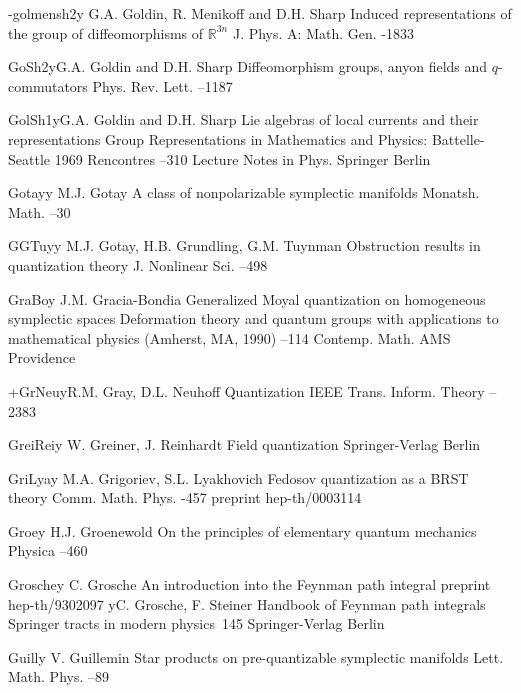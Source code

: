 \documentclass[12pt]{amsart}
\numberwithin{equation}{section}
\theoremstyle{remark}
\newcommand{\by}{\mathbf y}
\begin{document}
\begin{thebibliography}{199}
 -golmensh2\by{ G.A. Goldin, R. Menikoff and D.H. Sharp \paper Induced
representations of the group of diffeomorphisms of ${\mathbb R}^{3n}$ \jour J.
Phys. A: Math. Gen.   -1833}


 GoSh2\by{G.A. Goldin and D.H. Sharp \paper Diffeomorphism groups, anyon fields and
$q$-commutators \jour Phys. Rev. Lett.   --1187}

 GolSh1\by{G.A. Goldin and D.H. Sharp \paper Lie algebras of local currents
and their representations \inbook Group Representations in Mathematics and Physics:
Battelle-Seattle 1969 Rencontres --310 \bookinfo Lecture Notes in Phys. 
\publ Springer \publaddr Berlin }


 Gotay\by{ M.J. Gotay \paper A class of nonpolarizable symplectic
manifolds \jour Monatsh. Math.   --30}

 GGTuy\by{ M.J. Gotay, H.B. Grundling, G.M. Tuynman \paper Obstruction
results in quantization theory \jour J. Nonlinear Sci.   --498}

 GraBo\by{ J.M. Gracia-Bondia \paper Generalized Moyal quantization on
homogeneous symplectic spaces \inbook Deformation theory and quantum groups
with applications to mathematical physics (Amherst, MA, 1990) --114
\bookinfo Contemp. Math.  \publ AMS \publaddr Providence }

 +GrNeu\by{R.M. Gray, D.L. Neuhoff \paper Quantization \jour IEEE Trans.
Inform. Theory   --2383}

 GreiRei\by{ W. Greiner, J. Reinhardt \book Field quantization \publ
Springer-Verlag \publaddr Berlin }

 GriLya\by{ M.A. Grigoriev, S.L. Lyakhovich \paper Fedosov quantization as
a BRST theory \jour Comm. Math. Phys.   -457
\paperinfo preprint hep-th/0003114}

 Groe\by{ H.J. Groenewold \paper On the principles of elementary quantum
mechanics \jour Physica   --460}

 Grosche\by{ C. Grosche \paper An introduction into the Feynman path
integral \paperinfo preprint hep-th/9302097 \moreref\by C. Grosche, F. Steiner
\book Handbook of Feynman path integrals \bookinfo Springer tracts in modern
physics~145 \publ Springer-Verlag \publaddr Berlin }

 Guill\by{ V. Guillemin \paper Star products on pre-quantizable symplectic
manifolds \jour Lett. Math. Phys.   --89}


\end{thebibliography}
\end{document}
